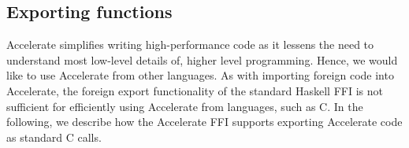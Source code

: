 
%

\subsection{Exporting functions}
\label{sec:foreign-export}

Accelerate simplifies writing high-performance code as it lessens the need to understand most low-level details of, higher level programming. Hence, we would like to use Accelerate from other languages. As with importing foreign code into Accelerate, the foreign export functionality of the standard Haskell FFI is not sufficient for efficiently using Accelerate from languages, such as C. In the following, we describe how the Accelerate FFI supports exporting Accelerate code as standard C calls.

